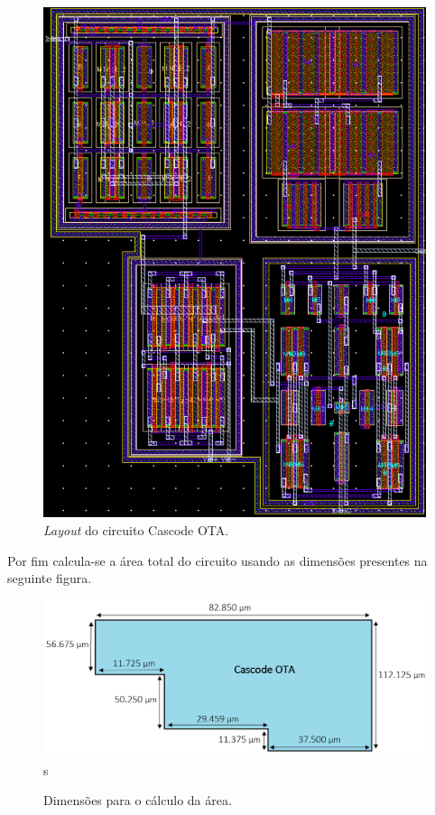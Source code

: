 \documentclass[11pt]{article}
\numberwithin{equation}{section}
\begin{document}
\begin{figure}[H]
	\centering
	\includegraphics[keepaspectratio=true, scale=0.50]{exps/layout/full}
	\vspace{-0.5em}
	\caption{\textit{Layout} do circuito Cascode OTA.}
	\vspace{-0.8em} 
\end{figure}

Por fim calcula-se a área total do circuito usando as dimensões presentes na seguinte figura.

\begin{figure}[H]
	\centering
	\includegraphics[keepaspectratio=true, scale=0.40]{teoricas/area}s
	\vspace{-0.5em}
	\caption{Dimensões para o cálculo da área.}
	\vspace{-0.8em} 
\end{figure}
\end{document}
